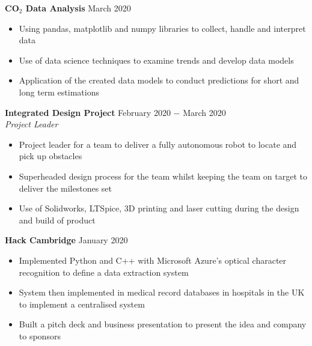 \documentclass{article}
\begin{document}
\textbf{CO$_{2}$ Data Analysis} \hfill  March 2020
\begin{itemize}
\item {Using pandas, matplotlib and numpy libraries to collect, handle and interpret data}
\item {Use of data science techniques to examine trends and develop data models}
\item Application of the created data models to conduct predictions for short and long term estimations
\end{itemize} \medskip

\textbf{Integrated Design Project} \hfill February 2020 $-$ March 2020\\
\textit{Project Leader}
\begin{itemize}
    \item Project leader for a team to deliver a fully autonomous robot to locate and pick up obstacles
    \item Superheaded design process for the team whilst keeping the team on target to  deliver the milestones set
    \item Use of Solidworks, LTSpice, 3D printing and laser cutting during the design and build of product
\end{itemize} \medskip

\textbf{Hack Cambridge} \hfill January 2020
\begin{itemize}
\item {Implemented Python and C++ with Microsoft Azure’s optical character recognition to define a data extraction system}
\item {System then implemented in medical record databases in hospitals in the UK to implement a centralised system}
\item {Built a pitch deck and business presentation to present the idea and company to sponsors}
\end{itemize}\medskip

\end{document}
